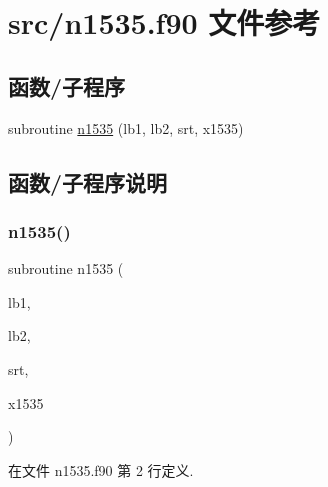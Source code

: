\hypertarget{n1535_8f90}{}\section{src/n1535.f90 文件参考}
\label{n1535_8f90}
\subsection*{函数/子程序}
\begin{DoxyCompactItemize}
\item 
subroutine \mbox{\hyperlink{n1535_8f90_a6cfc024d9f4ecaf410cc554dc0ebb73d}{n1535}} (lb1, lb2, srt, x1535)
\end{DoxyCompactItemize}


\subsection{函数/子程序说明}
\mbox{\label{n1535_8f90_a6cfc024d9f4ecaf410cc554dc0ebb73d}} 
\subsubsection{\texorpdfstring{n1535()}{n1535()}}
{\footnotesize\ttfamily subroutine n1535 (\begin{DoxyParamCaption}\item[{}]{lb1,  }\item[{}]{lb2,  }\item[{}]{srt,  }\item[{}]{x1535 }\end{DoxyParamCaption})}



在文件 n1535.\+f90 第 2 行定义.

